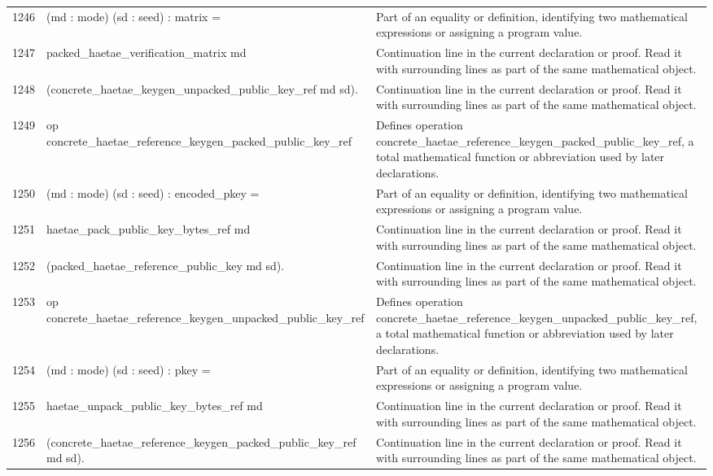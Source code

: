 \documentclass[10pt]{article}
\begin{document}
\begin{longtable}{r L{0.53\textwidth} L{0.37\textwidth}}
1246 & {\ttfamily\scriptsize    (md : mode) (sd : seed) : matrix =} & Part of an equality or definition, identifying two mathematical expressions or assigning a program value. \\
1247 & {\ttfamily\scriptsize   packed\_haetae\_verification\_matrix md} & Continuation line in the current declaration or proof.  Read it with surrounding lines as part of the same mathematical object. \\
1248 & {\ttfamily\scriptsize     (concrete\_haetae\_keygen\_unpacked\_public\_key\_ref md sd).} & Continuation line in the current declaration or proof.  Read it with surrounding lines as part of the same mathematical object. \\
1249 & {\ttfamily\scriptsize op concrete\_haetae\_reference\_keygen\_packed\_public\_key\_ref} & Defines operation concrete\_haetae\_reference\_keygen\_packed\_public\_key\_ref, a total mathematical function or abbreviation used by later declarations. \\
1250 & {\ttfamily\scriptsize    (md : mode) (sd : seed) : encoded\_pkey =} & Part of an equality or definition, identifying two mathematical expressions or assigning a program value. \\
1251 & {\ttfamily\scriptsize   haetae\_pack\_public\_key\_bytes\_ref md} & Continuation line in the current declaration or proof.  Read it with surrounding lines as part of the same mathematical object. \\
1252 & {\ttfamily\scriptsize     (packed\_haetae\_reference\_public\_key md sd).} & Continuation line in the current declaration or proof.  Read it with surrounding lines as part of the same mathematical object. \\
1253 & {\ttfamily\scriptsize op concrete\_haetae\_reference\_keygen\_unpacked\_public\_key\_ref} & Defines operation concrete\_haetae\_reference\_keygen\_unpacked\_public\_key\_ref, a total mathematical function or abbreviation used by later declarations. \\
1254 & {\ttfamily\scriptsize    (md : mode) (sd : seed) : pkey =} & Part of an equality or definition, identifying two mathematical expressions or assigning a program value. \\
1255 & {\ttfamily\scriptsize   haetae\_unpack\_public\_key\_bytes\_ref md} & Continuation line in the current declaration or proof.  Read it with surrounding lines as part of the same mathematical object. \\
1256 & {\ttfamily\scriptsize     (concrete\_haetae\_reference\_keygen\_packed\_public\_key\_ref md sd).} & Continuation line in the current declaration or proof.  Read it with surrounding lines as part of the same mathematical object. \\

\end{longtable}
\end{document}
